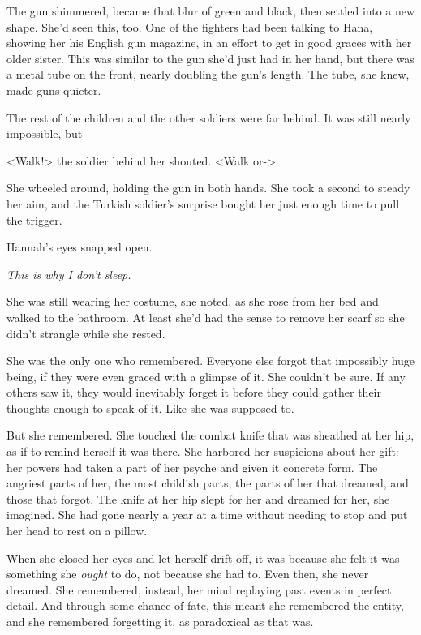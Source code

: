 The gun shimmered, became that blur of green and black, then settled into a new shape.  She'd seen this, too.  One of the fighters had been talking to Hana, showing her his English gun magazine, in an effort to get in good graces with her older sister.  This was similar to the gun she'd just had in her hand, but there was a metal tube on the front, nearly doubling the gun's length.  The tube, she knew, made guns quieter.



The rest of the children and the other soldiers were far behind.  It was still nearly impossible, but-



<Walk!> the soldier behind her shouted.  <Walk or->



She wheeled around, holding the gun in both hands.  She took a second to steady her aim, and the Turkish soldier's surprise bought her just enough time to pull the trigger.



Hannah's eyes snapped open.



\emph{This is why I don't sleep.}



She was still wearing her costume, she noted, as she rose from her bed and walked to the bathroom.  At least she'd had the sense to remove her scarf so she didn't strangle while she rested.



She was the only one who remembered.  Everyone else forgot that impossibly huge being, if they were even graced with a glimpse of it.  She couldn't be sure.  If any others saw it, they would inevitably forget it before they could gather their thoughts enough to speak of it.  Like she was supposed to.



But she remembered.  She touched the combat knife that was sheathed at her hip, as if to remind herself it was there.  She harbored her suspicions about her gift: her powers had taken a part of her psyche and given it concrete form.  The angriest parts of her, the most childish parts, the parts of her that dreamed, and those that forgot.  The knife at her hip slept for her and dreamed for her, she imagined.  She had gone nearly a year at a time without needing to stop and put her head to rest on a pillow.



When she closed her eyes and let herself drift off, it was because she felt it was something she \emph{ought} to do, not because she had to.  Even then, she never dreamed.  She remembered, instead, her mind replaying past events in perfect detail.  And through some chance of fate, this meant she remembered the entity, and she remembered forgetting it, as paradoxical as that was.



